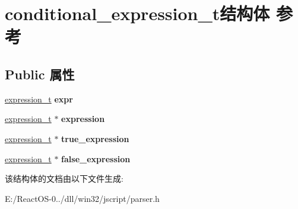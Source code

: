 \hypertarget{structconditional__expression__t}{}\section{conditional\+\_\+expression\+\_\+t结构体 参考}
\label{structconditional__expression__t}
\subsection*{Public 属性}
\begin{DoxyCompactItemize}
\item 
\mbox{\label{structconditional__expression__t_a93e8cb74e07c41ba13df957233f1a8e6}} 
\hyperlink{struct__expression__t}{expression\+\_\+t} {\bfseries expr}
\item 
\mbox{\label{structconditional__expression__t_a84ff5bcd56cdfe953a34fd8ce3f07b88}} 
\hyperlink{struct__expression__t}{expression\+\_\+t} $\ast$ {\bfseries expression}
\item 
\mbox{\label{structconditional__expression__t_a7ae86eeff05069fc114b0f2c427dad40}} 
\hyperlink{struct__expression__t}{expression\+\_\+t} $\ast$ {\bfseries true\+\_\+expression}
\item 
\mbox{\label{structconditional__expression__t_ab117532d68d20638a6a0f7b96b462e3e}} 
\hyperlink{struct__expression__t}{expression\+\_\+t} $\ast$ {\bfseries false\+\_\+expression}
\end{DoxyCompactItemize}


该结构体的文档由以下文件生成\+:\begin{DoxyCompactItemize}
\item 
E\+:/\+React\+O\+S-\/0../dll/win32/jscript/parser.\+h\end{DoxyCompactItemize}
